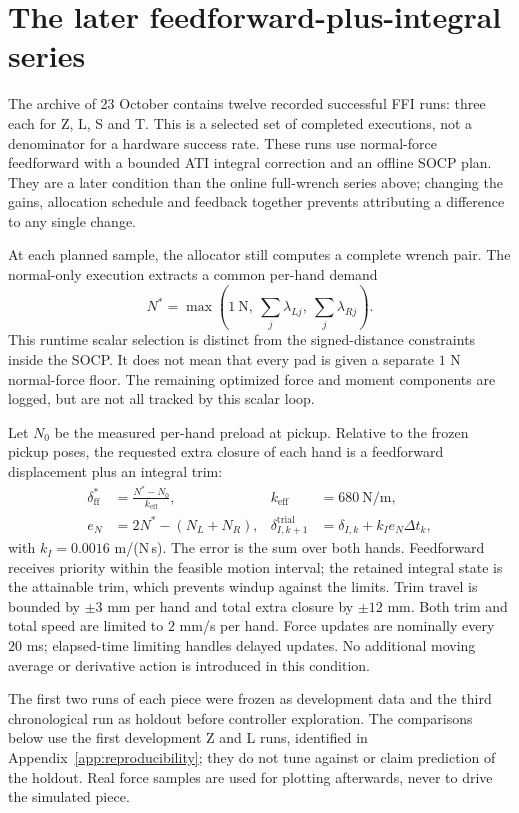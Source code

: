 \section{The later feedforward-plus-integral series}
\label{sec:kinova-ffi}

The archive of 23 October contains twelve recorded successful FFI runs: three each for Z, L, S and T. This is a selected set of completed executions, not a denominator for a hardware success rate. These runs use normal-force feedforward with a bounded ATI integral correction and an offline SOCP plan. They are a later condition than the online full-wrench series above; changing the gains, allocation schedule and feedback together prevents attributing a difference to any single change.

At each planned sample, the allocator still computes a complete wrench pair. The normal-only execution extracts a common per-hand demand
\begin{equation}
N^*=\max\left(1\ \mathrm{N},\ \sum_j\lambda_{Lj},\ \sum_j\lambda_{Rj}\right).
\end{equation}
This runtime scalar selection is distinct from the signed-distance constraints inside the SOCP. It does not mean that every pad is given a separate $1$ N normal-force floor. The remaining optimized force and moment components are logged, but are not all tracked by this scalar loop.

Let $N_0$ be the measured per-hand preload at pickup. Relative to the frozen pickup poses, the requested extra closure of each hand is a feedforward displacement plus an integral trim:
\begin{align}
\delta_{\mathrm{ff}}^*&=\frac{N^*-N_0}{k_{\mathrm{eff}}}, & k_{\mathrm{eff}}&=680\ \mathrm{N/m},\nonumber\\
e_N&=2N^*-(N_L+N_R), &
\delta_{I,k+1}^{\mathrm{trial}}&=\delta_{I,k}+k_I e_N\Delta t_k,
\label{eq:kinova-ffi}
\end{align}
with $k_I=0.0016$ m/(N\,s). The error is the sum over both hands. Feedforward receives priority within the feasible motion interval; the retained integral state is the attainable trim, which prevents windup against the limits. Trim travel is bounded by $\pm3$ mm per hand and total extra closure by $\pm12$ mm. Both trim and total speed are limited to $2$ mm/s per hand. Force updates are nominally every $20$ ms; elapsed-time limiting handles delayed updates. No additional moving average or derivative action is introduced in this condition.

The first two runs of each piece were frozen as development data and the third chronological run as holdout before controller exploration. The comparisons below use the first development Z and L runs, identified in Appendix~\ref{app:reproducibility}; they do not tune against or claim prediction of the holdout. Real force samples are used for plotting afterwards, never to drive the simulated piece.

